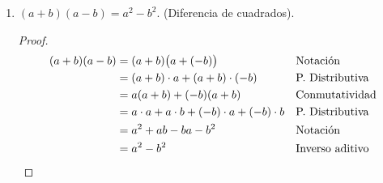 \documentclass[11pt]{article}
\begin{document}
\begin{enumerate}[label=\alph*)]
    \item $(a+b)(a-b)=a^2-b^2$. (Diferencia de cuadrados).
    \vspace{-1em}\begin{proof} 
        \begin{align*}
        (a+b)(a-b) &= (a+b)\bigl(a+(-b)\bigr) && \text{Notación}\\
        &= (a+b)\cdot a + (a+b)\cdot (-b) && \text{P. Distributiva}\\
        &= a(a+b) + (-b)(a+b) && \text{Conmutatividad}\\
        &= a\cdot a + a\cdot b + (-b)\cdot a + (-b) \cdot b && \text{P. Distributiva}\\
        &= a^2+ ab -ba -b^2 && \text{Notación}\\
        &=a^2-b^2 && \text{Inverso aditivo} \qedhere
        \end{align*}    
    \end{proof} \vspace{-1em}
%

\pagebreak


\end{enumerate}
\end{document}
